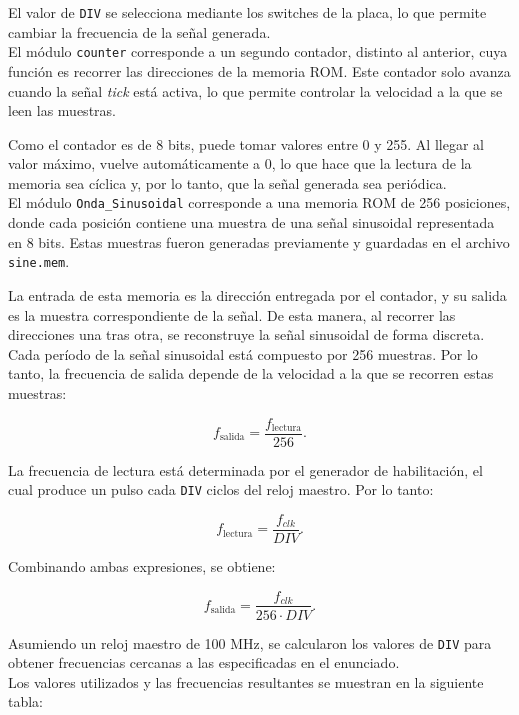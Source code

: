 \documentclass[letterpaper, 12pt]{article}
\begin{document}
El valor de \texttt{DIV} se selecciona mediante los switches de la placa, lo que permite cambiar la frecuencia de la señal generada.\\

El módulo \texttt{counter} corresponde a un segundo contador, distinto al anterior, cuya función es recorrer las direcciones de la memoria ROM. Este contador solo avanza cuando la señal \textit{tick} está activa, lo que permite controlar la velocidad a la que se leen las muestras.

Como el contador es de 8 bits, puede tomar valores entre 0 y 255. Al llegar al valor máximo, vuelve automáticamente a 0, lo que hace que la lectura de la memoria sea cíclica y, por lo tanto, que la señal generada sea periódica.\\

El módulo \texttt{Onda\_Sinusoidal} corresponde a una memoria ROM de 256 posiciones, donde cada posición contiene una muestra de una señal sinusoidal representada en 8 bits. Estas muestras fueron generadas previamente y guardadas en el archivo \texttt{sine.mem}.

La entrada de esta memoria es la dirección entregada por el contador, y su salida es la muestra correspondiente de la señal. De esta manera, al recorrer las direcciones una tras otra, se reconstruye la señal sinusoidal de forma discreta.\\

Cada período de la señal sinusoidal está compuesto por 256 muestras. Por lo tanto, la frecuencia de salida depende de la velocidad a la que se recorren estas muestras:

\[
f_{\text{salida}} = \frac{f_{\text{lectura}}}{256}.
\]

La frecuencia de lectura está determinada por el generador de habilitación, el cual produce un pulso cada \texttt{DIV} ciclos del reloj maestro. Por lo tanto:

\[
f_{\text{lectura}} = \frac{f_{clk}}{DIV}.
\]

Combinando ambas expresiones, se obtiene:

\[
f_{\text{salida}} = \frac{f_{clk}}{256 \cdot DIV}.
\]

Asumiendo un reloj maestro de 100 MHz, se calcularon los valores de \texttt{DIV} para obtener frecuencias cercanas a las especificadas en el enunciado.\\

Los valores utilizados y las frecuencias resultantes se muestran en la siguiente tabla:
\end{document}
